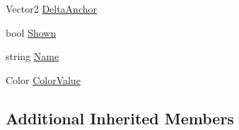 \begin{DoxyCompactItemize}
Vector2 \hyperlink{classgearit_1_1src_1_1robot_1_1_revolute_spot_aae43efd0acd982066e3e2fe90a66c117}{Delta\+Anchor}
\item 
bool \hyperlink{classgearit_1_1src_1_1robot_1_1_revolute_spot_a0f33ef11a1eb1accc6de38ad16d9af96}{Shown}
\item 
string \hyperlink{classgearit_1_1src_1_1robot_1_1_revolute_spot_a089c88ae435fc5585d96db0ffeabc73c}{Name}
\item 
Color \hyperlink{classgearit_1_1src_1_1robot_1_1_revolute_spot_a066a5e5de8cb2b1cab36a67be4a393e8}{Color\+Value}
\end{DoxyCompactItemize}
\subsection*{Additional Inherited Members}


